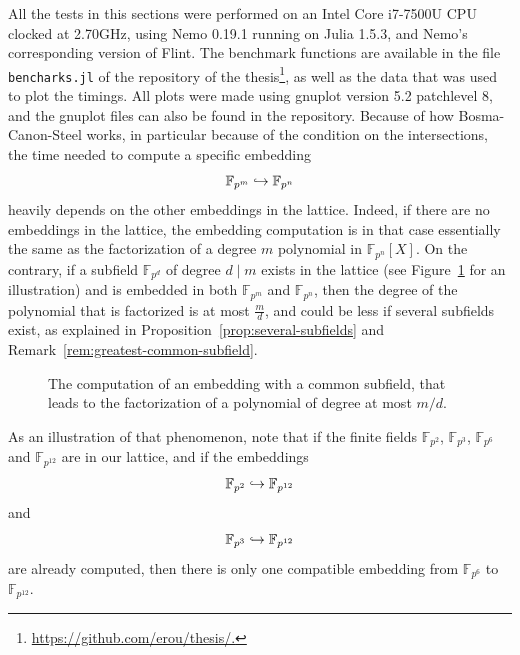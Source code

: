All the tests in this sections were performed on an Intel Core i7-7500U CPU
clocked at 2.70GHz, using Nemo 0.19.1 running on Julia 1.5.3, and
Nemo’s corresponding version of Flint. The benchmark functions are available in the
file \texttt{bencharks.jl} of the repository of the
thesis\footnote{\url{https://github.com/erou/thesis/.}}, as well as the data
that was used to plot the timings. All plots were made using gnuplot version 5.2
patchlevel 8, and the gnuplot files can also be found in the repository. Because
of how Bosma-Canon-Steel works, in particular because of the condition on the
intersections, the time needed to compute a specific embedding
\[
  \mathbb{F}_{p^{m}}\hookrightarrow\mathbb{F}_{p^{n}}
\]
heavily depends on the other embeddings in the lattice. Indeed, if there are no
embeddings in the lattice, the embedding computation is in that case essentially
the same as the factorization of a degree $m$ polynomial in
$\mathbb{F}_{p^{n}}[X]$. On the contrary, if a subfield
$\mathbb{F}_{p^{d}}$ of degree $d\mid m$ exists in the lattice (see
Figure~\ref{fig:illustration-common-subfield} for an illustration) and is embedded
in both $\mathbb{F}_{p^{m}}$ and $\mathbb{F}_{p^{n}}$, then the degree of the
polynomial that is factorized is at most $\frac{m}{d}$, and could be less if
several subfields exist, as explained in
Proposition~\ref{prop:several-subfields} and
Remark~\ref{rem:greatest-common-subfield}.
\begin{figure}[h]
  \label{fig:illustration-common-subfield}
  \centering
  \caption{The computation of an embedding with a common subfield, that leads to
  the factorization of a polynomial of degree at most $m/d$.}
\end{figure}
As an illustration of that phenomenon, note that if the finite fields
$\mathbb{F}_{p^{2}}$, $\mathbb{F}_{p^{3}}$, $\mathbb{F}_{p^{6}}$ and
$\mathbb{F}_{p^{12}}$ are in our lattice, and if the embeddings
\[
  \mathbb{F}_{p^{2}}\hookrightarrow \mathbb{F}_{p^{12}}
\]
and
\[
  \mathbb{F}_{p^{3}}\hookrightarrow \mathbb{F}_{p^{12}}
\]
are already computed, then there is only one compatible embedding from
$\mathbb{F}_{p^{6}}$ to $\mathbb{F}_{p^{12}}$.
